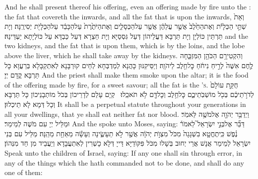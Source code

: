{And he shall present thereof his offering, even an offering made by fire unto the \lord: the fat that covereth the inwards, and all the fat that is upon the inwards,}{}
{וְאֵת֙ שְׁתֵּ֣י הַכְּלָיֹ֔ת וְאֶת\maqqaf הַחֵ֙לֶב֙ אֲשֶׁ֣ר עֲלֵהֶ֔ן אֲשֶׁ֖ר עַל\maqqaf הַכְּסָלִ֑ים וְאֶת\maqqaf הַיֹּתֶ֙רֶת֙ עַל\maqqaf הַכָּבֵ֔ד עַל\maqqaf הַכְּלָיֹ֖ת יְסִירֶֽנָּה׃}
{וְיָת תַּרְתֵּין כּוֹלְיָן וְיָת תַּרְבָּא דַּעֲלֵיהוֹן דְּעַל גִּסְסַיָּא וְיָת חַצְרָא דְּעַל כַּבְדָּא עַל כּוֹלְיָתָא יַעְדֵּינַהּ׃}
{and the two kidneys, and the fat that is upon them, which is by the loins, and the lobe above the liver, which he shall take away by the kidneys.}{}
{וְהִקְטִירָ֥ם הַכֹּהֵ֖ן הַמִּזְבֵּ֑חָה לֶ֤חֶם אִשֶּׁה֙ לְרֵ֣יחַ נִיחֹ֔חַ כׇּל\maqqaf חֵ֖לֶב לַיהֹוָֽה׃}
{וְיַסֵּיקִנּוּן כָּהֲנָא לְמַדְבְּחָא לְחֵים קוּרְבָּנָא לְאִתְקַבָּלָא בְּרַעֲוָא כָּל תַּרְבָּא קֳדָם יְיָ׃}
{And the priest shall make them smoke upon the altar; it is the food of the offering made by fire, for a sweet savour; all the fat is the \lord\textsc{’s}.}{}
{חֻקַּ֤ת עוֹלָם֙ לְדֹרֹ֣תֵיכֶ֔ם בְּכֹ֖ל מוֹשְׁבֹֽתֵיכֶ֑ם כׇּל\maqqaf חֵ֥לֶב וְכׇל\maqqaf דָּ֖ם לֹ֥א תֹאכֵֽלוּ׃ \petucha }
{קְיָם עָלַם לְדָרֵיכוֹן בְּכֹל מוֹתְבָנֵיכוֹן כָּל תַּרְבָּא וְכָל דְּמָא לָא תֵיכְלוּן׃}
{It shall be a perpetual statute throughout your generations in all your dwellings, that ye shall eat neither fat nor blood.}{}
\newperek
{}
{וַיְדַבֵּ֥ר יְהֹוָ֖ה אֶל\maqqaf מֹשֶׁ֥ה לֵּאמֹֽר׃}
{וּמַלֵּיל יְיָ עִם מֹשֶׁה לְמֵימַר׃}
{And the \lord\space spoke unto Moses, saying:}{}
{דַּבֵּ֞ר אֶל\maqqaf בְּנֵ֣י יִשְׂרָאֵל֮ לֵאמֹר֒ נֶ֗פֶשׁ כִּֽי\maqqaf תֶחֱטָ֤א בִשְׁגָגָה֙ מִכֹּל֙ מִצְוֺ֣ת יְהֹוָ֔ה אֲשֶׁ֖ר לֹ֣א תֵעָשֶׂ֑ינָה וְעָשָׂ֕ה מֵאַחַ֖ת מֵהֵֽנָּה׃}
{מַלֵּיל עִם בְּנֵי יִשְׂרָאֵל לְמֵימַר אֲנָשׁ אֲרֵי יְחוּב בְּשָׁלוּ מִכֹּל פִּקּוֹדַיָּא דַּייָ דְּלָא כָשְׁרִין לְאִתְעֲבָדָא וְיַעֲבֵיד מִן חַד מִנְּהוֹן׃}
{Speak unto the children of Israel, saying: If any one shall sin through error, in any of the things which the \lord\space hath commanded not to be done, and shall do any one of them:}{}
